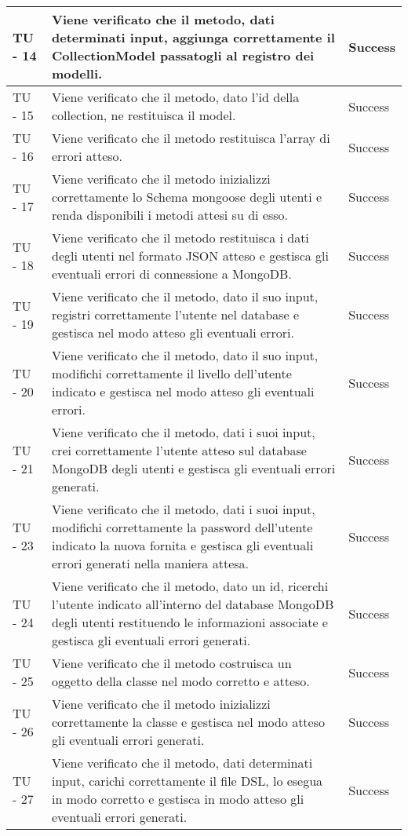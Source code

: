 \begin{center}
\begin{longtable}{ | p{3cm} | p{9cm} | p{2cm} | }
TU - 14 & Viene verificato che il metodo, dati determinati input, aggiunga correttamente il CollectionModel passatogli al registro dei modelli. & Success \\ \hline
TU - 15 & Viene verificato che il metodo, dato l'id della collection, ne restituisca il model. & Success \\ \hline
TU - 16 & Viene verificato che il metodo restituisca l'array di errori atteso. & Success \\ \hline
TU - 17 & Viene verificato che il metodo inizializzi correttamente lo Schema mongoose degli utenti e renda disponibili i metodi attesi su di esso. & Success \\ \hline
TU - 18 & Viene verificato che il metodo restituisca i dati degli utenti nel formato JSON atteso e gestisca gli eventuali errori di connessione a MongoDB. & Success \\ \hline
TU - 19 & Viene verificato che il metodo, dato il suo input, registri correttamente l'utente nel database e gestisca nel modo atteso gli eventuali errori. & Success \\ \hline
TU - 20 & Viene verificato che il metodo, dato il suo input, modifichi correttamente il livello dell'utente indicato e gestisca nel modo atteso gli eventuali errori. & Success \\ \hline
TU - 21 & Viene verificato che il metodo, dati i suoi input, crei correttamente l'utente atteso sul database MongoDB degli utenti e gestisca gli eventuali errori generati. & Success \\ \hline
TU - 23 & Viene verificato che il metodo, dati i suoi input, modifichi correttamente la password dell'utente indicato la nuova fornita e gestisca gli eventuali errori generati nella maniera attesa. & Success \\ \hline
TU - 24 & Viene verificato che il metodo, dato un id, ricerchi l'utente indicato all'interno del database MongoDB degli utenti restituendo le informazioni associate e gestisca gli eventuali errori generati. & Success \\ \hline
TU - 25 & Viene verificato che il metodo costruisca un oggetto della classe nel modo corretto e atteso. & Success \\ \hline
TU - 26 & Viene verificato che il metodo inizializzi correttamente la classe e gestisca nel modo atteso gli eventuali errori generati. & Success \\ \hline
TU - 27 & Viene verificato che il metodo, dati determinati input, carichi correttamente il file DSL, lo esegua in modo corretto e gestisca in modo atteso gli eventuali errori generati. & Success \\ \hline

\end{longtable}
\end{center}
